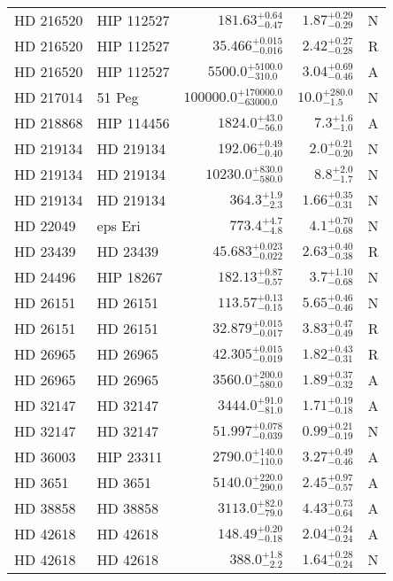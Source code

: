 \begin{longtable*}{llrrr}
HD 216520 & HIP 112527 & $181.63^{+0.64}_{-0.47}$ & $1.87^{+0.29}_{-0.29}$ & N \\
HD 216520 & HIP 112527 & $35.466^{+0.015}_{-0.016}$ & $2.42^{+0.27}_{-0.28}$ & R \\
HD 216520 & HIP 112527 & $5500.0^{+5100.0}_{-310.0}$ & $3.04^{+0.69}_{-0.46}$ & A \\
HD 217014 & 51 Peg & $100000.0^{+170000.0}_{-63000.0}$ & $10.0^{+280.0}_{-1.5}$ & N \\
HD 218868 & HIP 114456 & $1824.0^{+43.0}_{-56.0}$ & $7.3^{+1.6}_{-1.0}$ & A \\
HD 219134 & HD 219134 & $192.06^{+0.49}_{-0.40}$ & $2.0^{+0.21}_{-0.20}$ & N \\
HD 219134 & HD 219134 & $10230.0^{+830.0}_{-580.0}$ & $8.8^{+2.0}_{-1.7}$ & N \\
HD 219134 & HD 219134 & $364.3^{+1.9}_{-2.3}$ & $1.66^{+0.35}_{-0.31}$ & N \\
HD 22049 & eps Eri & $773.4^{+4.7}_{-4.8}$ & $4.1^{+0.70}_{-0.68}$ & N \\
HD 23439 & HD 23439 & $45.683^{+0.023}_{-0.022}$ & $2.63^{+0.40}_{-0.38}$ & R \\
HD 24496 & HIP 18267 & $182.13^{+0.87}_{-0.57}$ & $3.7^{+1.10}_{-0.68}$ & N \\
HD 26151 & HD 26151 & $113.57^{+0.13}_{-0.15}$ & $5.65^{+0.46}_{-0.46}$ & N \\
HD 26151 & HD 26151 & $32.879^{+0.015}_{-0.017}$ & $3.83^{+0.47}_{-0.49}$ & R \\
HD 26965 & HD 26965 & $42.305^{+0.015}_{-0.019}$ & $1.82^{+0.43}_{-0.31}$ & R \\
HD 26965 & HD 26965 & $3560.0^{+200.0}_{-580.0}$ & $1.89^{+0.37}_{-0.32}$ & A \\
HD 32147 & HD 32147 & $3444.0^{+91.0}_{-81.0}$ & $1.71^{+0.19}_{-0.18}$ & A \\
HD 32147 & HD 32147 & $51.997^{+0.078}_{-0.039}$ & $0.99^{+0.21}_{-0.19}$ & N \\
HD 36003 & HIP 23311 & $2790.0^{+140.0}_{-110.0}$ & $3.27^{+0.49}_{-0.46}$ & A \\
HD 3651 & HD 3651 & $5140.0^{+220.0}_{-290.0}$ & $2.45^{+0.97}_{-0.57}$ & A \\
HD 38858 & HD 38858 & $3113.0^{+82.0}_{-79.0}$ & $4.43^{+0.73}_{-0.64}$ & A \\
HD 42618 & HD 42618 & $148.49^{+0.20}_{-0.18}$ & $2.04^{+0.24}_{-0.24}$ & A \\
HD 42618 & HD 42618 & $388.0^{+1.8}_{-2.2}$ & $1.64^{+0.28}_{-0.24}$ & N \\

\end{longtable*}
